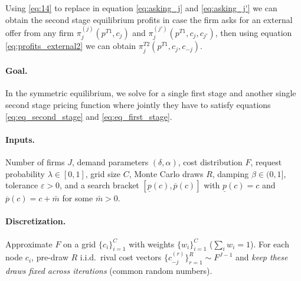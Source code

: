 \documentclass[12pt]{article}
\begin{document}
Using \ref{eq:14} to replace in equation \ref{eq:asking_j} and \ref{eq:asking_j'} we can obtain the second stage equilibrium profits in case the firm asks for an external offer from any firm $\pi_j^{(j)}(p^{T1}, c_j)$ and $\pi_j^{(j')}(p^{T1}, c_j, c_{j'})$, then using equation \ref{eq:profits_external2} we can obtain $\pi_j^{T2}(p^{T1}, c_j, c_{-j})$. 

\paragraph{Goal.} In the symmetric equilibrium, we solve for a single first stage and another single second stage pricing function where jointly they have to satisfy equations \ref{eq:eq_second_stage} and \ref{eq:eq_first_stage}. 

\paragraph{Inputs.} Number of firms $J$, demand parameters $(\delta,\alpha)$, cost distribution $F$,
request probability $\lambda\in[0,1]$, grid size $C$, Monte Carlo draws $R$, damping $\beta\in(0,1]$,
tolerance $\varepsilon>0$, and a search bracket $[\underline p(c), \overline p(c)]$ with
$\underline p(c)=c$ and $\overline p(c)=c+\bar m$ for some $\bar m>0$.

\paragraph{Discretization.} Approximate $F$ on a grid $\{c_i\}_{i=1}^C$ with weights
$\{w_i\}_{i=1}^C$ ($\sum_i w_i=1$). For each node $c_i$, pre-draw $R$ i.i.d.\ rival cost vectors
$\{c^{(r)}_{-j}\}_{r=1}^R \sim F^{J-1}$ and \emph{keep these draws fixed across iterations}
(common random numbers).

\vspace{3cm}
\end{document}
